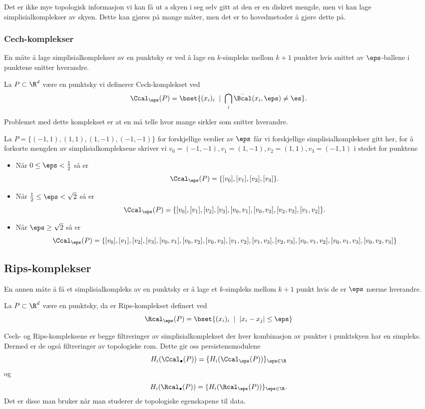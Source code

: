 Det er ikke mye topologisk informasjon vi kan få ut a skyen i seg selv gitt at den er en diskret mengde, men vi kan lage simplisialkomplekser av skyen. Dette kan gjøres på mange måter, men det er to hovedmetoder å gjøre dette på.

\subsubsection{Cech-komplekser}
En måte å lage simplisialkomplekser av en punktsky er ved å lage en $k$-simpleks mellom $k+1$ punkter hvis snittet av $\eps$-ballene i punktene snitter hverandre.

\begin{definition}\label{Def:Cech}
    La $P\subset\R^d$ være en punktsky vi definerer Cech-komplekset ved
    \[\Ccal_\eps(P) = \bset{(x_i)_i \;\mid\; \bigcap_i\bar{\Bcal}(x_i,\eps)\neq\es}.\]
\end{definition}
Problemet med dette komplekset er at en må telle hvor mange sirkler som snitter hverandre.

\begin{example}\label{Ex:label}
	La $P = \{(-1,1), (1,1), (1,-1), (-1,-1)\}$ for forskjellige verdier av $\eps$ får vi forskjellige simplisialkomplekser gitt her, for å forkorte mengden av simplisialkompleksene skriver vi $v_0=(-1,-1),v_1=(1,-1),v_2=(1,1),v_3=(-1,1)$ i stedet for punktene
	\begin{itemize}
		\item Når $0\leq\eps<\frac{1}{2}$ så er \[\Ccal_\eps(P) = \{[v_0],[v_1],[v_2],[v_3]\}.\]
		\item Når $\frac{1}{2}\leq\eps<\sqrt{2}$ så er \[\Ccal_\eps(P) = \{[v_0],[v_1],[v_2],[v_3],[v_0,v_1], [v_0,v_3], [v_2,v_3], [v_1,v_2]\}.\]
		\item Når $\eps\geq\sqrt{2}$ så er \[\Ccal_\eps(P) = \{[v_0],[v_1],[v_2],[v_3],[v_0,v_1],[v_0,v_2],[v_0,v_3],[v_1,v_2],[v_1,v_3],[v_2,v_3],[v_0,v_1,v_2],[v_0,v_1,v_3],[v_0,v_2,v_3]\}\]
	\end{itemize}
\end{example}

\subsection{Rips-komplekser}
En annen måte å få et simplisialkompleks av en punktsky er å lage et $k$-simpleks mellom $k+1$ punkt hvis de er $\eps$ nærme hverandre.
\begin{definition}\label{Def:Rips}
    La $P\subset\R^d$ være en punktsky, da er Rips-komplekset definert ved
    \[\Rcal_\eps(P) = \bset{(x_i)_i\;\mid\; |x_i-x_j|\leq\eps}\]
\end{definition}

Cech- og Rips-kompleksene er begge filtreringer av simplisialkomplekset der hver kombinasjon av punkter i punktskyen har en simpleks. Dermed er de også filtreringer av topologiske rom. Dette gir oss persistensmodulene
\[H_i(\Ccal_\bullet(P)) = \{H_i(\Ccal_\eps(P))\}_{\eps\in\R}\]
og
\[H_i(\Rcal_\bullet(P)) = \{H_i(\Rcal_\eps(P))\}_{\eps\in\R}.\]
Det er disse man bruker når man studerer de topologiske egenskapene til data.
